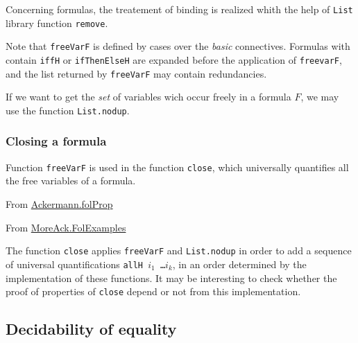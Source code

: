 
Concerning formulas, the treatement of binding is realized 
whith the help of \texttt{List} library function \texttt{remove}.


\begin{remark}
  Note that \texttt{freeVarF} is defined by cases over the \emph{basic} connectives. Formulas with contain \texttt{iffH} or
\texttt{ifThenElseH} are expanded before the application of
\texttt{freevarF}, and the 
list returned by \texttt{freeVarF} may contain redundancies.

If we want to get the \emph{set} of variables wich occur freely 
in a formula $F$, we may use the function \texttt{List.nodup}.



\end{remark}

\subsubsection{Closing a formula}
Function \texttt{freeVarF} is used in 
the  function \texttt{close}, which  universally quantifies  all the free variables of a formula.

\noindent From \href{../theories/html/hydras.Ackermann.folProp.html}{Ackermann.folProp}


\noindent From \href{../theories/html/hydras.MoreAck.FolExamples.html}{MoreAck.FolExamples}


\begin{remark}
  The function \texttt{close} applies \texttt{freeVarF} and
  \texttt{List.nodup}  in order to add a sequence of universal
  quantifications \texttt{allH $i_1$ \dots $i_k$}, in an order determined by the implementation of these functions. It may be interesting to check whether the proof of properties of \texttt{close} depend or not from this implementation.
\end{remark}


\subsection{Decidability of equality}

